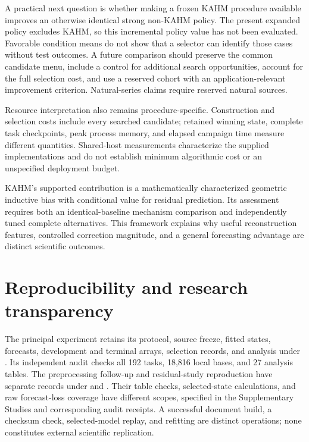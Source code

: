 A practical next question is whether making a frozen KAHM procedure
available improves an otherwise identical strong non-KAHM policy.
The present expanded policy excludes KAHM, so this incremental policy
value has not been evaluated. Favorable condition means do not show that
a selector can identify those cases without test outcomes. A future
comparison should preserve the common candidate menu, include a control
for additional search opportunities, account for the full selection
cost, and use a reserved cohort with an application-relevant improvement
criterion. Natural-series claims require reserved natural sources.

Resource interpretation also remains procedure-specific. Construction
and selection costs include every searched candidate; retained winning
state, complete task checkpoints, peak process memory, and elapsed
campaign time measure different quantities. Shared-host measurements
characterize the supplied implementations and do not establish minimum
algorithmic cost or an unspecified deployment budget.

KAHM's supported contribution is a mathematically characterized
geometric inductive bias with conditional value for residual prediction.
Its assessment requires both an identical-baseline mechanism comparison
and independently tuned complete alternatives. This framework explains
why useful reconstruction features, controlled correction magnitude,
and a general forecasting advantage are distinct scientific outcomes.

\section*{Reproducibility and research transparency}

The principal experiment retains its protocol, source freeze, fitted
states, forecasts, development and terminal arrays, selection records,
and analysis under . Its
independent audit checks all 192 tasks, 18,816 local bases, and 27
analysis tables. The preprocessing follow-up and residual-study
reproduction have separate records under
 and
.
Their table checks, selected-state calculations, and raw forecast-loss
coverage have different scopes, specified in the Supplementary Studies
and corresponding audit receipts. A successful document build, a
checksum check, selected-model replay, and refitting are distinct
operations; none constitutes external scientific replication.


